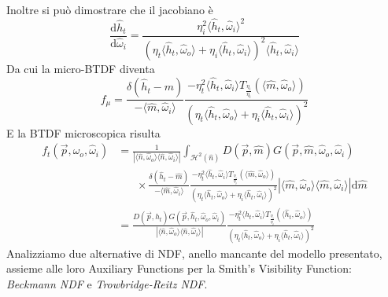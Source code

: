 Inoltre si pu\`o dimostrare che il jacobiano \`e
{
	\newcommand{\htoi}{\langle\hat{h}_t,\hat{\omega}_i\rangle}
	\newcommand{\htoo}{\langle\hat{h}_t,\hat{\omega}_o\rangle}
	\begin{equation}
		\frac{\mathrm{d}\hat{h}_t}{\mathrm{d}\hat{\omega}_i}=\frac{\eta_i^2\htoi^2}%
			{(\eta_t\htoo+\eta_i\htoi)^2\htoi}
	\end{equation}
	Da cui la micro-BTDF diventa
	\begin{equation}
		f_\mu=\frac{\delta(\hat{h}_t-\hat{m})}{-\langle\hat{m},\hat{\omega}_i\rangle}
		\frac{-\eta_t^2\htoi T_{\frac{\eta_i}{\eta_t}}(\langle\hat{m},\hat{\omega}_o\rangle)}%
			{(\eta_t\htoo+\eta_i\htoi)^2}
	\end{equation}
	E la BTDF microscopica risulta
	\begin{align}
		f_t(\vec{p},\hat{\omega}_o,\hat{\omega}_i)&=\frac{1}{|\langle\hat{n},\hat{\omega}_o\rangle\langle\hat{n},\hat{\omega}_i\rangle|}%
			\int_{\mathcal{H}^2(\hat{n})}D(\vec{p},\hat{m})G(\vec{p},\hat{m},\hat{\omega}_o,\hat{\omega}_i) \nonumber \\
			&\;\;\;\;\;\;\times\frac{\delta(\hat{h}_t-\hat{m})}{-\langle\hat{m},\hat{\omega}_i\rangle}
			\frac{-\eta_t^2\htoi T_{\frac{\eta_i}{\eta_t}}(\langle\hat{m},\hat{\omega}_o\rangle)}%
			{(\eta_t\htoo+\eta_i\htoi)^2}
			|\langle\hat{m},\hat{\omega}_o\rangle\langle\hat{m},\hat{\omega}_i\rangle|\mathrm{d}\hat{m} \nonumber \\
			&=\frac{D(\vec{p},\hat{h}_t)G(\vec{p},\hat{h}_t,\hat{\omega}_o,\hat{\omega}_i)}
				{|\langle\hat{n},\hat{\omega}_o\rangle\langle\hat{n},\hat{\omega}_i\rangle|}
			\frac{-\eta_t^2\htoi T_{\frac{\eta_i}{\eta_t}}(\langle\hat{h}_t,\hat{\omega}_o\rangle)}%
			{(\eta_t\htoo+\eta_i\htoi)^2}
	\end{align}
}
Analizziamo due alternative di NDF, anello mancante del modello presentato, assieme alle loro Auxiliary Functions per la Smith's Visibility Function:
\textit{Beckmann NDF} e \textit{Trowbridge-Reitz NDF}.

